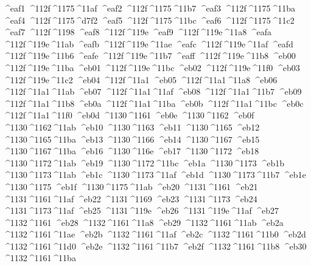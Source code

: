\checkit ^^^^eaf1 ^^^^112f^^^^1175^^^^11af
\checkit ^^^^eaf2 ^^^^112f^^^^1175^^^^11b7
\checkit ^^^^eaf3 ^^^^112f^^^^1175^^^^11ba
\checkit ^^^^eaf4 ^^^^112f^^^^1175^^^^d7f2
\checkit ^^^^eaf5 ^^^^112f^^^^1175^^^^11bc
\checkit ^^^^eaf6 ^^^^112f^^^^1175^^^^11c2
\checkit ^^^^eaf7 ^^^^112f^^^^1198
\checkit ^^^^eaf8 ^^^^112f^^^^119e
\checkit ^^^^eaf9 ^^^^112f^^^^119e^^^^11a8
\checkit ^^^^eafa ^^^^112f^^^^119e^^^^11ab
\checkit ^^^^eafb ^^^^112f^^^^119e^^^^11ae
\checkit ^^^^eafc ^^^^112f^^^^119e^^^^11af
\checkit ^^^^eafd ^^^^112f^^^^119e^^^^11b6
\checkit ^^^^eafe ^^^^112f^^^^119e^^^^11b7
\checkit ^^^^eaff ^^^^112f^^^^119e^^^^11b8
\checkit ^^^^eb00 ^^^^112f^^^^119e^^^^11ba
\checkit ^^^^eb01 ^^^^112f^^^^119e^^^^11bc
\checkit ^^^^eb02 ^^^^112f^^^^119e^^^^11f0
\checkit ^^^^eb03 ^^^^112f^^^^119e^^^^11c2
\checkit ^^^^eb04 ^^^^112f^^^^11a1
\checkit ^^^^eb05 ^^^^112f^^^^11a1^^^^11a8
\checkit ^^^^eb06 ^^^^112f^^^^11a1^^^^11ab
\checkit ^^^^eb07 ^^^^112f^^^^11a1^^^^11af
\checkit ^^^^eb08 ^^^^112f^^^^11a1^^^^11b7
\checkit ^^^^eb09 ^^^^112f^^^^11a1^^^^11b8
\checkit ^^^^eb0a ^^^^112f^^^^11a1^^^^11ba
\checkit ^^^^eb0b ^^^^112f^^^^11a1^^^^11bc
\checkit ^^^^eb0c ^^^^112f^^^^11a1^^^^11f0
\checkit ^^^^eb0d ^^^^1130^^^^1161
\checkit ^^^^eb0e ^^^^1130^^^^1162
\checkit ^^^^eb0f ^^^^1130^^^^1162^^^^11ab
\checkit ^^^^eb10 ^^^^1130^^^^1163
\checkit ^^^^eb11 ^^^^1130^^^^1165
\checkit ^^^^eb12 ^^^^1130^^^^1165^^^^11ba
\checkit ^^^^eb13 ^^^^1130^^^^1166
\checkit ^^^^eb14 ^^^^1130^^^^1167
\checkit ^^^^eb15 ^^^^1130^^^^1167^^^^11ba
\checkit ^^^^eb16 ^^^^1130^^^^116e
\checkit ^^^^eb17 ^^^^1130^^^^1172
\checkit ^^^^eb18 ^^^^1130^^^^1172^^^^11ab
\checkit ^^^^eb19 ^^^^1130^^^^1172^^^^11bc
\checkit ^^^^eb1a ^^^^1130^^^^1173
\checkit ^^^^eb1b ^^^^1130^^^^1173^^^^11ab
\checkit ^^^^eb1c ^^^^1130^^^^1173^^^^11af
\checkit ^^^^eb1d ^^^^1130^^^^1173^^^^11b7
\checkit ^^^^eb1e ^^^^1130^^^^1175
\checkit ^^^^eb1f ^^^^1130^^^^1175^^^^11ab
\checkit ^^^^eb20 ^^^^1131^^^^1161
\checkit ^^^^eb21 ^^^^1131^^^^1161^^^^11af
\checkit ^^^^eb22 ^^^^1131^^^^1169
\checkit ^^^^eb23 ^^^^1131^^^^1173
\checkit ^^^^eb24 ^^^^1131^^^^1173^^^^11af
\checkit ^^^^eb25 ^^^^1131^^^^119e
\checkit ^^^^eb26 ^^^^1131^^^^119e^^^^11af
\checkit ^^^^eb27 ^^^^1132^^^^1161
\checkit ^^^^eb28 ^^^^1132^^^^1161^^^^11a8
\checkit ^^^^eb29 ^^^^1132^^^^1161^^^^11ab
\checkit ^^^^eb2a ^^^^1132^^^^1161^^^^11ae
\checkit ^^^^eb2b ^^^^1132^^^^1161^^^^11af
\checkit ^^^^eb2c ^^^^1132^^^^1161^^^^11b0
\checkit ^^^^eb2d ^^^^1132^^^^1161^^^^11d0
\checkit ^^^^eb2e ^^^^1132^^^^1161^^^^11b7
\checkit ^^^^eb2f ^^^^1132^^^^1161^^^^11b8
\checkit ^^^^eb30 ^^^^1132^^^^1161^^^^11ba
